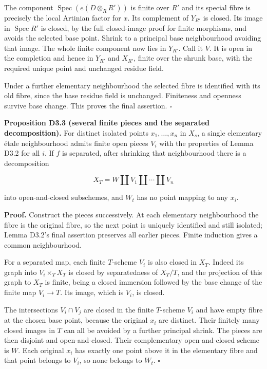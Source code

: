 \documentclass[11pt,a4paper,openany]{report}
\newcounter{none}
\begin{document}
The component \(\operatorname{Spec}(e(D\otimes_RR'))\) is finite over \(R'\) and its special fibre is precisely the local Artinian factor for \(x\). Its complement of \(Y_{R'}\) is closed. Its image in \(\operatorname{Spec}R'\) is closed, by the full closed-image proof for finite morphisms, and avoids the selected base point. Shrink to a principal base neighbourhood avoiding that image. The whole finite component now lies in \(Y_{R'}\). Call it \(V\). It is open in the completion and hence in \(Y_{R'}\) and \(X_{R'}\), finite over the shrunk base, with the required unique point and unchanged residue field.

Under a further elementary neighbourhood the selected fibre is identified with its old fibre, since the base residue field is unchanged. Finiteness and openness survive base change. This proves the final assertion. \(\square\)

\textbf{Proposition D3.3 (several finite pieces and the separated decomposition).} For distinct isolated points \(x_1,\ldots,x_n\) in \(X_s\), a single elementary étale neighbourhood admits finite open pieces \(V_i\) with the properties of Lemma D3.2 for all \(i\). If \(f\) is separated, after shrinking that neighbourhood there is a decomposition

\[
X_T=W\amalg V_1\amalg\cdots\amalg V_n                                  \tag{3.1}
\]

into open-and-closed subschemes, and \(W_t\) has no point mapping to any \(x_i\).

\textbf{Proof.} Construct the pieces successively. At each elementary neighbourhood the fibre is the original fibre, so the next point is uniquely identified and still isolated; Lemma D3.2's final assertion preserves all earlier pieces. Finite induction gives a common neighbourhood.

For a separated map, each finite \(T\)-scheme \(V_i\) is also closed in \(X_T\). Indeed its graph into \(V_i\times_TX_T\) is closed by separatedness of \(X_T/T\), and the projection of this graph to \(X_T\) is finite, being a closed immersion followed by the base change of the finite map \(V_i\to T\). Its image, which is \(V_i\), is closed.

The intersections \(V_i\cap V_j\) are closed in the finite \(T\)-scheme \(V_i\) and have empty fibre at the chosen base point, because the original \(x_i\) are distinct. Their finitely many closed images in \(T\) can all be avoided by a further principal shrink. The pieces are then disjoint and open-and-closed. Their complementary open-and-closed scheme is \(W\). Each original \(x_i\) has exactly one point above it in the elementary fibre and that point belongs to \(V_i\), so none belongs to \(W_t\). \(\square\)
\end{document}
